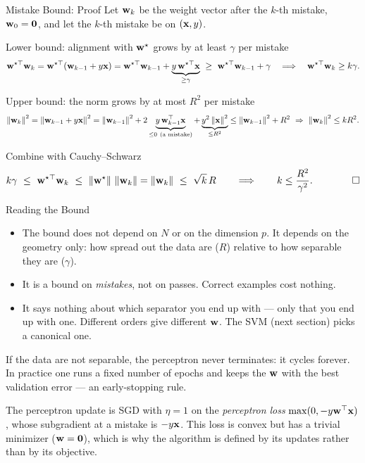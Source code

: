 \documentclass[11pt,aspectratio=169]{beamer}
\begin{document}
\begin{frame}{Mistake Bound: Proof}\footnotesize
Let $\mathbf{w}_k$ be the weight vector after the $k$-th mistake, $\mathbf{w}_0=\mathbf{0}$, and let the $k$-th mistake be on $(\mathbf{x},y)$.
\begin{derivation}{Lower bound: alignment with $\mathbf{w}^\star$ grows by at least $\gamma$ per mistake}
\[
\mathbf{w}^{\star\top}\mathbf{w}_k=\mathbf{w}^{\star\top}(\mathbf{w}_{k-1}+y\mathbf{x})=\mathbf{w}^{\star\top}\mathbf{w}_{k-1}+\underbrace{y\,\mathbf{w}^{\star\top}\mathbf{x}}_{\ge\gamma}
\ \ge\ \mathbf{w}^{\star\top}\mathbf{w}_{k-1}+\gamma
\quad\Longrightarrow\quad \mathbf{w}^{\star\top}\mathbf{w}_k\ge k\gamma .
\]
\end{derivation}
\begin{derivation}{Upper bound: the norm grows by at most $R^2$ per mistake}
\[
\norm{\vw_k}^2=\norm{\vw_{k-1}+y\vx}^2=\norm{\vw_{k-1}}^2+2\underbrace{y\,\vw_{k-1}\T\vx}_{\le0\ \text{(a mistake)}}+\underbrace{y^2\norm{\vx}^2}_{\le R^2}
\le\norm{\vw_{k-1}}^2+R^2
\ \Rightarrow\ \norm{\vw_k}^2\le kR^2 .
\]
\end{derivation}
\begin{derivation}{Combine with Cauchy--Schwarz}
\[
k\gamma\ \le\ \vw^{\star\top}\vw_k\ \le\ \norm{\vw^\star}\,\norm{\vw_k}=\norm{\vw_k}\ \le\ \sqrt{k}\,R
\qquad\Longrightarrow\qquad k\le\frac{R^2}{\gamma^2}.\qquad\qed
\]
\end{derivation}
\end{frame}

\begin{frame}{Reading the Bound}
\begin{itemize}
  \item The bound does not depend on $N$ or on the dimension $p$. It depends on the geometry only:
        how spread out the data are ($R$) relative to how separable they are ($\gamma$).
  \item It is a bound on \emph{mistakes}, not on passes. Correct examples cost nothing.
  \item It says nothing about which separator you end up with --- only that you end up with one.
        Different orders give different $\mathbf{w}$. The SVM (next section) picks a canonical one.
\end{itemize}
\begin{caution}
If the data are not separable, the perceptron never terminates: it cycles forever. In practice one runs
a fixed number of epochs and keeps the $\mathbf{w}$ with the best validation error --- an early-stopping rule.
\end{caution}
\begin{keypoint}
The perceptron update is SGD with $\eta=1$ on the \emph{perceptron loss} $\max(0,-y\mathbf{w}^{\top}\mathbf{x})$, whose
subgradient at a mistake is $-y\mathbf{x}$. This loss is convex but has a trivial minimizer ($\mathbf{w}=\mathbf{0}$),
which is why the algorithm is defined by its updates rather than by its objective.
\end{keypoint}
\end{frame}
\end{document}

